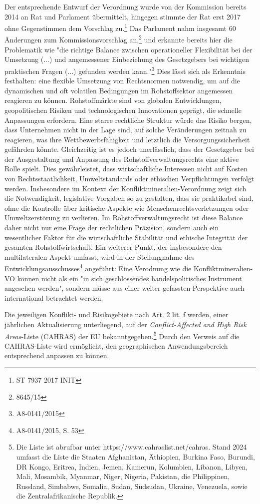 \documentclass[12pt,a4paper,oneside]{book} %
\begin{document}
Der entsprechende Entwurf der Verordnung wurde von der Kommission bereits 2014 an Rat und Parlament übermittelt, hingegen stimmte der Rat erst 2017 ohne Gegenstimmen dem Vorschlag zu.\footnote{ST 7937 2017 INIT} Das Parlament nahm insgesamt 60 Änderungen zum Kommissionsvorschlag an,\footnote{8645/15} und erkannte bereits hier die Problematik wie "die richtige Balance zwischen operationeller Flexibilität bei der Umsetzung (...) und angemessener Einbeziehung des Gesetzgebers bei wichtigen praktischen Fragen (...) gefunden werden kann."\footnote{A8-0141/2015} Dies lässt sich als Erkenntnis festhalten: eine flexible Umsetzung von Rechtsnormen notwendig, um auf die dynamischen und oft volatilen Bedingungen im Rohstoffsektor angemessen reagieren zu können. Rohstoffmärkte sind von globalen Entwicklungen, geopolitischen Risiken und technologischen Innovationen geprägt, die schnelle Anpassungen erfordern. Eine starre rechtliche Struktur würde das Risiko bergen, dass Unternehmen nicht in der Lage sind, auf solche Veränderungen zeitnah zu reagieren, was ihre Wettbewerbsfähigkeit und letztlich die Versorgungssicherheit gefährden könnte. Gleichzeitig ist es jedoch unerlässlich, dass der Gesetzgeber bei der Ausgestaltung und Anpassung des Rohstoffverwaltungsrechts eine aktive Rolle spielt. Dies gewährleistet, dass wirtschaftliche Interessen nicht auf Kosten von Rechtsstaatlichkeit, Umweltstandards oder ethischen Verpflichtungen verfolgt werden. Insbesondere im Kontext der Konfliktmineralien-Verordnung zeigt sich die Notwendigkeit, legislative Vorgaben so zu gestalten, dass sie praktikabel sind, ohne die Kontrolle über kritische Aspekte wie Menschenrechtsverletzungen oder Umweltzerstörung zu verlieren. Im Rohstoffverwaltungsrecht ist diese Balance daher nicht nur eine Frage der rechtlichen Präzision, sondern auch ein wesentlicher Faktor für die wirtschaftliche Stabilität und ethische Integrität der gesamten Rohstoffwirtschaft.
Ein weiterer Punkt, der insbesondere den multilateralen Aspekt umfasst, wird in der Stellungnahme des Entwicklungsausschusses\footnote{A8-0141/2015, S. 53} angeführt: Eine Verodnung wie die Konfliktmineralien-VO können nicht als ein "in sich geschlossendes handelspolitisches Instrument angesehen werden", sondern müsse aus einer weiter gefassten Perspektive auch international betrachtet werden.

Die jeweiligen Konflikt- und Risikogebiete nach Art. 2 lit. f werden, einer jährlichen Aktualisierung unterliegend, auf der \textit{Conflict-Affected and High Risk Areas}-Liste (CAHRAS) der EU bekanntgegeben.\footnote{Die Liste ist abrufbar unter https://www.cahraslist.net/cahras. Stand 2024 umfasst die Liste die Staaten Afghanistan, Äthiopien, Burkina Faso, Burundi, DR Kongo, Eritrea, Indien, Jemen, Kamerun, Kolumbien, Libanon, Libyen, Mali, Mosambik, Myanmar, Niger, Nigeria, Pakistan, die Philippinen, Russland, Simbabwe, Somalia, Sudan, Südsudan, Ukraine, Venezuela, sowie die Zentralafrikanische Republik.} Durch den Verweis auf die CAHRAS-Liste wird ermöglicht, den geographischen Anwendungsbereich entsprechend anpassen zu können.
\end{document}
